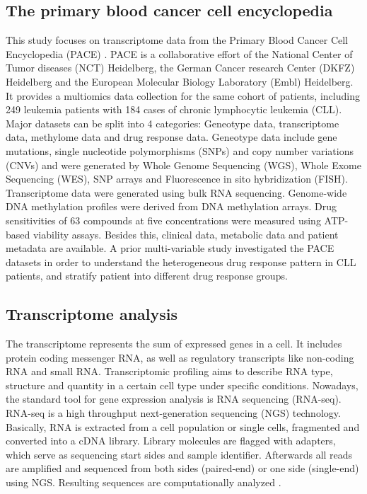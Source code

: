 \subsection{The primary blood cancer cell encyclopedia}
This study focuses on transcriptome data from the Primary Blood Cancer Cell Encyclopedia (PACE) \citep{Dietrich}. PACE is a collaborative effort of the National Center of Tumor diseases (NCT) Heidelberg, the German Cancer research Center (DKFZ) Heidelberg and the European Molecular Biology Laboratory (Embl) Heidelberg. It provides a multiomics data collection for the same cohort of patients, including 249 leukemia patients with 184 cases of chronic lymphocytic leukemia (CLL). Major datasets can be split into 4 categories: Geneotype data, transcriptome data, methylome data and drug response data. Geneotype data include gene mutations, single nucleotide polymorphisms (SNPs) and copy number variations (CNVs) and were generated by Whole Genome Sequencing (WGS), Whole Exome Sequencing (WES), SNP arrays and Fluorescence in sito hybridization (FISH). Transcriptome data were generated using bulk RNA sequencing. Genome-wide DNA methylation profiles were derived from DNA methylation arrays. Drug sensitivities of 63 compounds at five concentrations were measured using ATP-based viability assays. Besides this, clinical data, metabolic data and patient metadata are available. A prior multi-variable study investigated the PACE datasets in order to understand the heterogeneous drug response pattern in CLL patients, and stratify patient into different drug response groups\citep{Dietrich}.


\subsection{Transcriptome analysis}
The transcriptome represents the sum of expressed genes in a cell. It includes protein coding messenger RNA, as well as regulatory transcripts like non-coding RNA and small RNA. Transcriptomic profiling aims to describe RNA type, structure and quantity in a certain cell type under specific conditions.
Nowadays, the standard tool for gene expression analysis is RNA sequencing (RNA-seq). RNA-seq is a high throughput next-generation sequencing (NGS) technology. Basically, RNA is extracted from a cell population or single cells, fragmented and converted into a cDNA library. Library molecules are flagged with adapters, which serve as sequencing start sides and sample identifier. Afterwards all reads are amplified and sequenced from both sides (paired-end) or one side (single-end) using NGS. Resulting sequences are computationally analyzed \citep{Wang2009}.  

